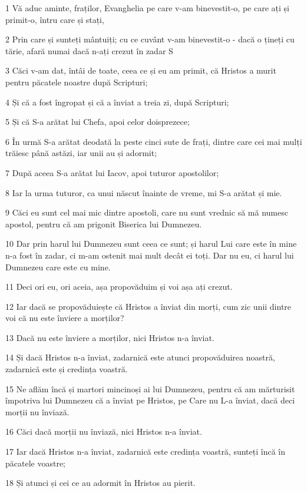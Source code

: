 \par 1 Vă aduc aminte, fraților, Evanghelia pe care v-am binevestit-o, pe care ați și primit-o, întru care și stați,
\par 2 Prin care și sunteți mântuiți; cu ce cuvânt v-am binevestit-o - dacă o țineți cu tărie, afară numai dacă n-ați crezut în zadar S
\par 3 Căci v-am dat, întâi de toate, ceea ce și eu am primit, că Hristos a murit pentru păcatele noastre după Scripturi;
\par 4 Și că a fost îngropat și că a înviat a treia zi, după Scripturi;
\par 5 Și că S-a arătat lui Chefa, apoi celor doisprezece;
\par 6 În urmă S-a arătat deodată la peste cinci sute de frați, dintre care cei mai mulți trăiesc până astăzi, iar unii au și adormit;
\par 7 După aceea S-a arătat lui Iacov, apoi tuturor apostolilor;
\par 8 Iar la urma tuturor, ca unui născut înainte de vreme, mi S-a arătat și mie.
\par 9 Căci eu sunt cel mai mic dintre apostoli, care nu sunt vrednic să mă numesc apostol, pentru că am prigonit Biserica lui Dumnezeu.
\par 10 Dar prin harul lui Dumnezeu sunt ceea ce sunt; și harul Lui care este în mine n-a fost în zadar, ci m-am ostenit mai mult decât ei toți. Dar nu eu, ci harul lui Dumnezeu care este cu mine.
\par 11 Deci ori eu, ori aceia, așa propovăduim și voi așa ați crezut.
\par 12 Iar dacă se propovăduiește că Hristos a înviat din morți, cum zic unii dintre voi că nu este înviere a morților?
\par 13 Dacă nu este înviere a morților, nici Hristos n-a înviat.
\par 14 Și dacă Hristos n-a înviat, zadarnică este atunci propovăduirea noastră, zadarnică este și credința voastră.
\par 15 Ne aflăm încă și martori mincinoși ai lui Dumnezeu, pentru că am mărturisit împotriva lui Dumnezeu că a înviat pe Hristos, pe Care nu L-a înviat, dacă deci morții nu înviază.
\par 16 Căci dacă morții nu înviază, nici Hristos n-a înviat.
\par 17 Iar dacă Hristos n-a înviat, zadarnică este credința voastră, sunteți încă în păcatele voastre;
\par 18 Și atunci și cei ce au adormit în Hristos au pierit.
